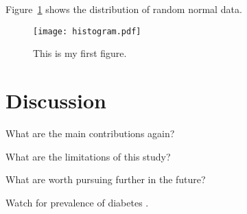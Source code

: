 \documentclass[12pt]{article}
\begin{document}
Figure~\ref{fig:histogram} shows the distribution of random normal data.


\begin{figure}[tbp]
  \centering
  \texttt{[image: histogram.pdf]}
  \caption{This is my first figure.}
  \label{fig:histogram}
\end{figure}

\section{Discussion}
\label{sec:disc}

What are the main contributions again?

What are the limitations of this study?

What are worth pursuing further in the future?

\lipsum[1]
Watch for prevalence of diabetes \citep{wild2004global}.



\end{document}
